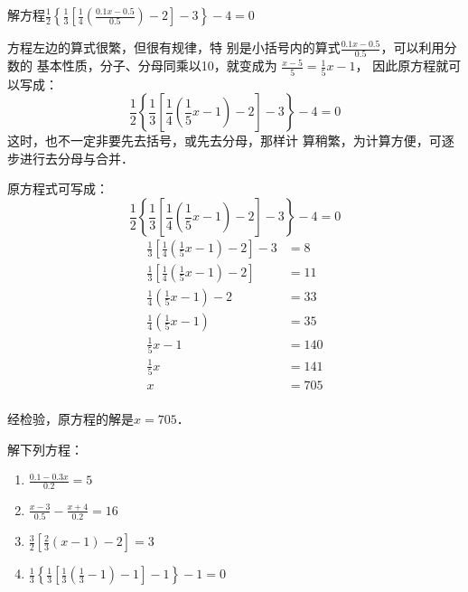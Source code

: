 \begin{example}
    解方程$\frac{1}{2}\left\{\frac{1}{3}\left[\frac{1}{4}\left(\frac{0.1x-0.5}{0.5}\right)-2\right]-3\right\}-4=0$
\end{example}

\begin{analyze}
方程左边的算式很繁，但很有规律，特
    别是小括号内的算式$\frac{0.1x-0.5}{0.5}$，可以利用分数的
    基本性质，分子、分母同乘以10，就变成为
$\frac{x-5}{5}=\frac{1}{5}x-1$，
    因此原方程就可以写成：
   \[\frac{1}{2}\left\{\frac{1}{3}\left[\frac{1}{4}\left(\frac{1}{5}x-1\right)-2\right]-3\right\}-4=0 \]
    这时，也不一定非要先去括号，或先去分母，那样计
    算稍繁，为计算方便，可逐步进行去分母与合并．
\end{analyze}

\begin{solution}
    原方程式可写成：\[\frac{1}{2}\left\{\frac{1}{3}\left[\frac{1}{4}\left(\frac{1}{5}x-1\right)-2\right]-3\right\}-4=0 \]
\begin{align*}
    \frac{1}{3}\left[\frac{1}{4}\left(\frac{1}{5}x-1\right)-2\right]-3 &=8  \tag{两边乘以2}\\
    \frac{1}{3}\left[\frac{1}{4}\left(\frac{1}{5}x-1\right)-2\right]&=11   \tag{移项、合并}\\
    \frac{1}{4}\left(\frac{1}{5}x-1\right)-2&=33  \tag{两边乘以3}\\
    \frac{1}{4}\left(\frac{1}{5}x-1\right)&=35   \tag{移项、合并}\\
    \frac{1}{5}x-1&=140 \tag{两边乘以4}\\
    \frac{1}{5}x&=141  \tag{移项、合并}\\
    x&=705  \tag{两边乘以5}\\
\end{align*}   

经检验，原方程的解是$x=705$．
\end{solution}

\begin{ex}
解下列方程：
\begin{enumerate}
    \item $\frac{0.1-0.3x}{0.2}=5$
    \item $\frac{x-3}{0.5}-\frac{x+4}{0.2}=16$
    \item $\frac{3}{2}\left[\frac{2}{3}(x-1)-2\right]=3$
    \item $\frac{1}{3}\left\{\frac{1}{3}\left[\frac{1}{3}\left(\frac{1}{3}-1\right)-1\right]-1\right\}-1=0$
\end{enumerate}
\end{ex}

